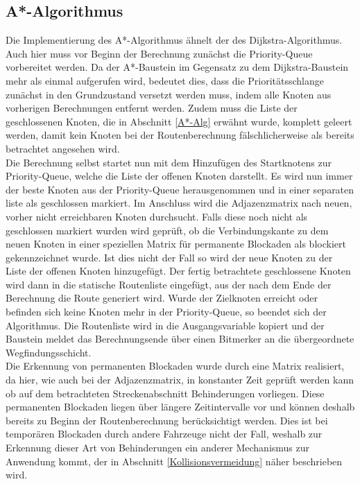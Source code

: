 		\subsection{A*-Algorithmus}
			\label{Implementierung A*}
			Die Implementierung des A*-Algorithmus ähnelt der des Dijkstra-Algorithmus. Auch hier muss vor Beginn der Berechnung zunächst die Priority-Queue vorbereitet werden. Da der A*-Baustein im Gegensatz zu dem Dijkstra-Baustein mehr als einmal aufgerufen wird,  bedeutet dies, dass die Prioritätsschlange zunächst in den Grundzustand versetzt werden muss, indem alle Knoten aus vorherigen Berechnungen entfernt werden. Zudem muss die Liste der geschlossenen Knoten, die in Abschnitt \ref{A*-Alg} erwähnt wurde, komplett geleert werden, damit kein Knoten bei der Routenberechnung fälschlicherweise als bereits betrachtet angesehen wird.
			\\[4pt]
			Die Berechnung selbst startet nun mit dem Hinzufügen des Startknotens zur Priority-Queue, welche die Liste der offenen Knoten darstellt. Es wird nun immer der beste Knoten aus der Priority-Queue herausgenommen und in einer separaten liste als geschlossen markiert. Im Anschluss wird die Adjazenzmatrix nach neuen, vorher nicht erreichbaren Knoten durchsucht. Falls diese noch nicht als geschlossen markiert wurden wird geprüft, ob die Verbindungskante zu dem neuen Knoten in einer speziellen Matrix für permanente Blockaden als blockiert gekennzeichnet wurde. Ist dies nicht der Fall so wird der neue Knoten zu der Liste der offenen Knoten hinzugefügt. Der fertig betrachtete geschlossene Knoten wird dann in die statische Routenliste eingefügt, aus der nach dem Ende der Berechnung die Route generiert wird. Wurde der Zielknoten erreicht oder befinden sich keine Knoten mehr in der Priority-Queue, so beendet sich der Algorithmus. Die Routenliste wird in die Ausgangsvariable kopiert und der Baustein meldet das Berechnungsende über einen Bitmerker an die übergeordnete Wegfindungsschicht.
			\\[4pt]
			Die Erkennung von permanenten Blockaden wurde durch eine Matrix realisiert, da hier, wie auch bei der Adjazenzmatrix, in konstanter Zeit geprüft werden kann ob auf dem betrachteten Streckenabschnitt Behinderungen vorliegen. Diese permanenten Blockaden liegen über längere Zeitintervalle vor und können deshalb bereits zu Beginn der Routenberechnung berücksichtigt werden. Dies ist bei temporären Blockaden durch andere Fahrzeuge nicht der Fall, weshalb zur Erkennung dieser Art von Behinderungen ein anderer Mechanismus zur Anwendung kommt, der in Abschnitt \ref{Kollisionsvermeidung} näher beschrieben wird.
			
